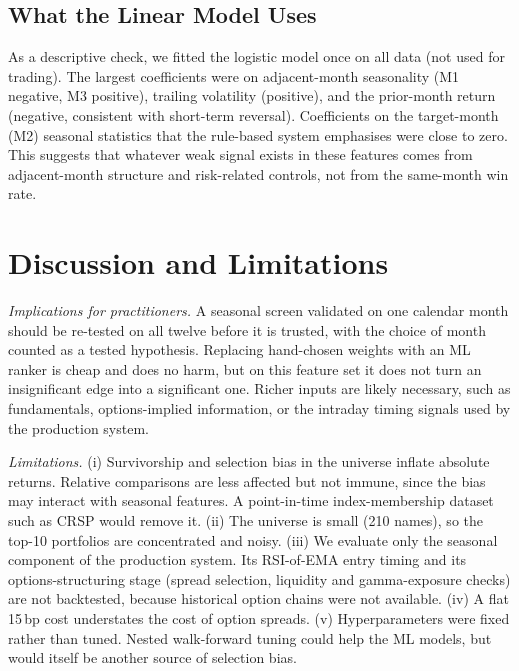 \documentclass[conference]{IEEEtran}
\begin{document}
\subsection{What the Linear Model Uses}
As a descriptive check, we fitted the logistic model once on all data (not used for trading). The largest coefficients were on adjacent-month seasonality (M1 negative, M3 positive), trailing volatility (positive), and the prior-month return (negative, consistent with short-term reversal). Coefficients on the target-month (M2) seasonal statistics that the rule-based system emphasises were close to zero. This suggests that whatever weak signal exists in these features comes from adjacent-month structure and risk-related controls, not from the same-month win rate.

\section{Discussion and Limitations}

\textit{Implications for practitioners.} A seasonal screen validated on one calendar month should be re-tested on all twelve before it is trusted, with the choice of month counted as a tested hypothesis. Replacing hand-chosen weights with an ML ranker is cheap and does no harm, but on this feature set it does not turn an insignificant edge into a significant one. Richer inputs are likely necessary, such as fundamentals, options-implied information, or the intraday timing signals used by the production system.

\textit{Limitations.} (i) Survivorship and selection bias in the universe inflate absolute returns. Relative comparisons are less affected but not immune, since the bias may interact with seasonal features. A point-in-time index-membership dataset such as CRSP would remove it. (ii) The universe is small (210 names), so the top-10 portfolios are concentrated and noisy. (iii) We evaluate only the seasonal component of the production system. Its RSI-of-EMA entry timing and its options-structuring stage (spread selection, liquidity and gamma-exposure checks) are not backtested, because historical option chains were not available. (iv) A flat 15\,bp cost understates the cost of option spreads. (v) Hyperparameters were fixed rather than tuned. Nested walk-forward tuning could help the ML models, but would itself be another source of selection bias.

\end{document}
